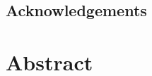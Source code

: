 \documentclass[a4paper,oneside,12pt]{book}
\begin{document}
\newpage


\onehalfspacing\raggedright %

\section*{\Huge{Acknowledgements}}


\singlespacing\justify
\chapter*{Abstract}


\onehalfspacing\raggedright %
\newpage

\tableofcontents
\listoffigures
\listoftables
\newpage


\justify
\mainmatter










\appendix
\renewcommand{\thechapter}{A\arabic{chapter}}

\end{document}

